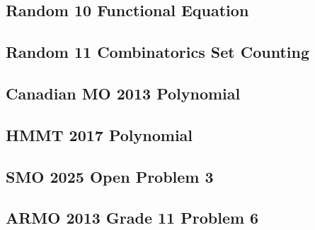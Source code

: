 \subsection{Random 10 Functional Equation}

\newpage

\subsection{Random 11 Combinatorics Set Counting}

\newpage

\subsection{Canadian MO 2013 Polynomial}

\newpage

\subsection{HMMT 2017 Polynomial}


\subsection{SMO 2025 Open Problem 3}


\subsection{ARMO 2013 Grade 11 Problem 6}
